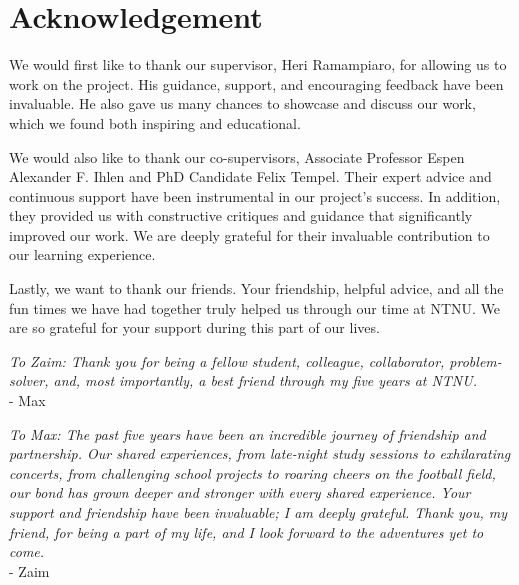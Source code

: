 \chapter*{Acknowledgement}
We would first like to thank our supervisor, Heri Ramampiaro, for allowing us to work on the project. His guidance, support, and encouraging feedback have been invaluable. He also gave us many chances to showcase and discuss our work, which we found both inspiring and educational.

We would also like to thank our co-supervisors, Associate Professor Espen Alexander F. Ihlen and PhD Candidate Felix Tempel. Their expert advice and continuous support have been instrumental in our project's success. In addition, they provided us with constructive critiques and guidance that significantly improved our work. We are deeply grateful for their invaluable contribution to our learning experience.

Lastly, we want to thank our friends. Your friendship, helpful advice, and all the fun times we have had together truly helped us through our time at NTNU. We are so grateful for your support during this part of our lives.

\begin{flushright}
\textit{To Zaim: Thank you for being a fellow student, colleague, collaborator, problem-solver, and, most importantly, a best friend through my five years at NTNU.} \\
- Max
\end{flushright}

\begin{flushright}
\textit{To Max: The past five years have been an incredible journey of friendship and partnership. Our shared experiences, from late-night study sessions to exhilarating concerts, from challenging school projects to roaring cheers on the football field, our bond has grown deeper and stronger with every shared experience. Your support and friendship have been invaluable; I am deeply grateful. Thank you, my friend, for being a part of my life, and I look forward to the adventures yet to come.} \\
- Zaim
\end{flushright}


